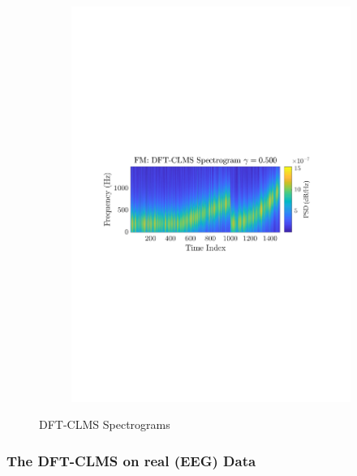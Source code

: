 \documentclass[12pt]{article}
\numberwithin{equation}{section}
\begin{document}
\begin{figure}[H]
\begin{subfigure}{0.49\textwidth}
					\includegraphics[trim={2.2cm 11.2cm 3.00cm  11.2cm}, clip, width=\textwidth]{../MATLAB/figures/q3_3c_fig05.pdf} 
					\captionsetup{justification=centering}
				\end{subfigure}
				
				\captionsetup{justification=centering}
				\caption{DFT-CLMS Spectrograms}
				\label{fig: 3-3c}
			\end{figure}
			
			
		\subsubsection{The DFT-CLMS on real (EEG) Data}
			
\end{document}
